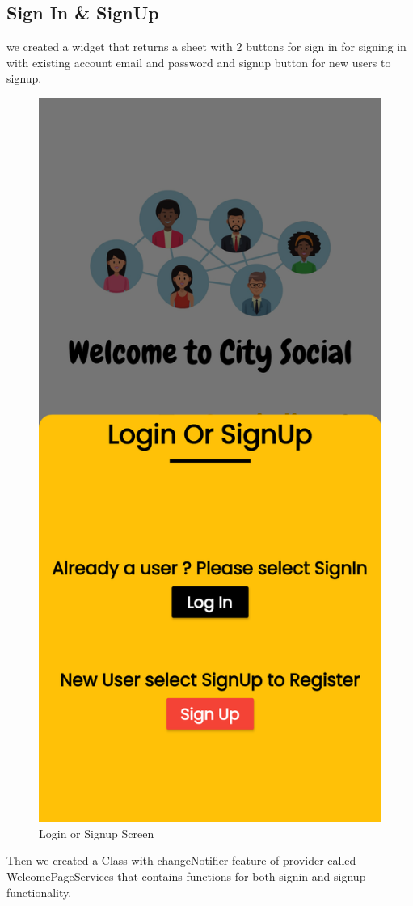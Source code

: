 \subsection{Sign In \& SignUp}
we created a widget that returns a sheet with 2 buttons for sign in for signing in with existing account email and password and signup button for new users to signup.
\begin{figure}[H]
    \centering
    \includegraphics[scale=0.10]{App Screenshots/Login or Signup Page.png}
    \caption{Login or Signup Screen}
    \label{fig:Login or Signup Screen}
\end{figure}
Then we created a Class with changeNotifier feature of provider called WelcomePageServices that contains functions for both signin and signup functionality.

